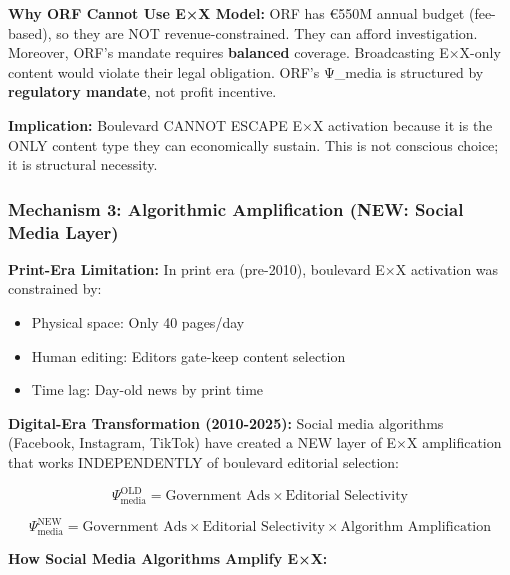 \textbf{Why ORF Cannot Use E×X Model:}
ORF has €550M annual budget (fee-based), so they are NOT revenue-constrained. They can afford
investigation. Moreover, ORF's mandate requires \textbf{balanced} coverage. Broadcasting E×X-only
content would violate their legal obligation. ORF's Ψ_media is structured by \textbf{regulatory mandate},
not profit incentive.

\textbf{Implication:} Boulevard CANNOT ESCAPE E×X activation because it is the ONLY content type
they can economically sustain. This is not conscious choice; it is structural necessity.

\subsubsection*{Mechanism 3: Algorithmic Amplification (NEW: Social Media Layer)}

\textbf{Print-Era Limitation:}
In print era (pre-2010), boulevard E×X activation was constrained by:
\begin{itemize}
\item Physical space: Only 40 pages/day
\item Human editing: Editors gate-keep content selection
\item Time lag: Day-old news by print time
\end{itemize}

\textbf{Digital-Era Transformation (2010-2025):}
Social media algorithms (Facebook, Instagram, TikTok) have created a NEW layer of E×X amplification
that works INDEPENDENTLY of boulevard editorial selection:

\[
\Psi_{\text{media}}^{\text{OLD}} = \text{Government Ads} \times \text{Editorial Selectivity}
\]

\[
\Psi_{\text{media}}^{\text{NEW}} = \text{Government Ads} \times \text{Editorial Selectivity} \times \text{Algorithm Amplification}
\]

\textbf{How Social Media Algorithms Amplify E×X:}

